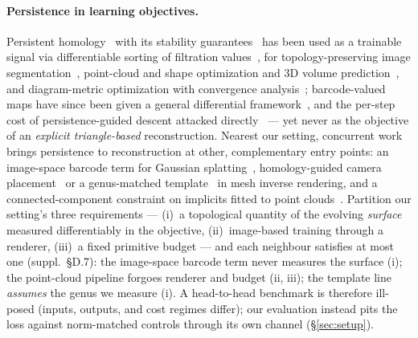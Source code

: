 \paragraph{Persistence in learning objectives.}
Persistent homology~\citep{edelsbrunner2002persistence} with its stability
guarantees~\citep{cohensteiner2007stability} has been used as a trainable
signal via differentiable sorting of filtration
values~\citep{gabrielsson2020topologylayer}, for topology-preserving image
segmentation~\citep{hu2019topopreserving,clough2022topoloss}, point-cloud
and shape optimization and 3D volume
prediction~\citep{bruel2020toporecon,poulenard2018shapematching,waibel2022topological},
and diagram-metric optimization with convergence
analysis~\citep{carriere2021optimizing}; barcode-valued maps have since been
given a general differential framework~\citep{leygonie2022framework}, and the
per-step cost of persistence-guided descent attacked
directly~\citep{nigmetov2024bigsteps} --- yet never as the objective of
an \emph{explicit triangle-based} reconstruction.
Nearest our setting, concurrent work brings persistence to
reconstruction at other, complementary entry points: an image-space barcode term for
Gaussian splatting~\citep{shen2025topologygs}, homology-guided camera
placement~\citep{gao2026homology} or a genus-matched
template~\citep{gao2025genus} in mesh inverse rendering, and a
connected-component constraint on implicits fitted to point
clouds~\citep{jignasu2024stitch}.
Partition our setting's three requirements --- (i)~a topological quantity
of the evolving \emph{surface} measured differentiably in the objective,
(ii)~image-based training through a renderer, (iii)~a fixed primitive
budget --- and each neighbour satisfies at most one (suppl.\ \S D.7): the
image-space barcode term never measures the surface (i); the point-cloud
pipeline forgoes renderer and budget (ii, iii); the template line
\emph{assumes} the genus we measure (i). A head-to-head benchmark is
therefore ill-posed (inputs, outputs, and cost regimes differ); our
evaluation instead pits the loss against norm-matched controls through
its own channel (\S\ref{sec:setup}).
